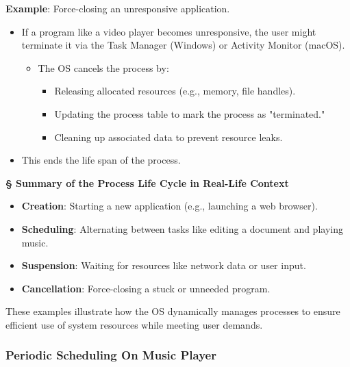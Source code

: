 \documentclass[a4paper]{book}
\newcommand{\sfbf}[1]{{\normalsize\textsf{\textbf{§ #1}}}}
\begin{document}
\textbf{Example}: Force-closing an unresponsive application.
\begin{itemize}
\item 
If a program like a video player becomes unresponsive, the user might terminate it via the Task Manager (Windows) or Activity Monitor (macOS).
\begin{itemize}
\item 
The OS cancels the process by:
\begin{itemize}
\item 
Releasing allocated resources (e.g., memory, file handles).

\item 
Updating the process table to mark the process as "terminated."

\item 
Cleaning up associated data to prevent resource leaks.

\end{itemize}

\end{itemize}

\item 
This ends the life span of the process.

\end{itemize}

\hrulefill

\sfbf{Summary of the Process Life Cycle in Real-Life Context}

\begin{itemize}
\item 
\textbf{Creation}: Starting a new application (e.g., launching a web browser).

\item 
\textbf{Scheduling}: Alternating between tasks like editing a document and playing music.

\item 
\textbf{Suspension}: Waiting for resources like network data or user input.

\item 
\textbf{Cancellation}: Force-closing a stuck or unneeded program.

\end{itemize}

These examples illustrate how the OS dynamically manages processes to ensure efficient use of system resources while meeting user demands.

\subsubsection{Periodic Scheduling On Music Player}
\end{document}
